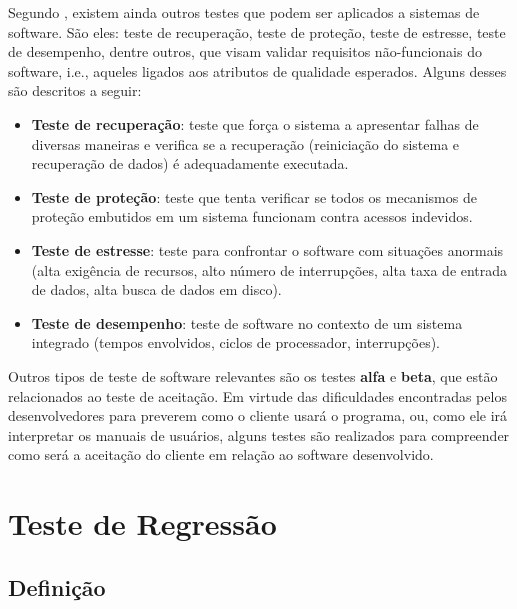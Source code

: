 Segundo , existem ainda outros testes que podem ser aplicados a sistemas de software. São eles: teste de recuperação, teste de proteção, teste de estresse, teste de desempenho, dentre outros, que visam validar requisitos não-funcionais do software, i.e., aqueles ligados aos atributos de qualidade esperados. Alguns desses são descritos a seguir:

\begin{itemize}
    
    \item \textbf{Teste de recuperação}: teste que força o sistema a apresentar falhas de diversas maneiras e verifica se a recuperação (reiniciação do sistema e recuperação de dados) é adequadamente executada.
    
    \item \textbf{Teste de proteção}: teste que tenta verificar se todos os mecanismos de proteção embutidos em um sistema funcionam contra acessos indevidos.
    
    \item \textbf{Teste de estresse}: teste para confrontar o software com situações anormais (alta exigência de recursos, alto número de interrupções, alta taxa de entrada de dados, alta busca de dados em disco).
    
    \item \textbf{Teste de desempenho}: teste de software no contexto de um sistema integrado (tempos envolvidos, ciclos de processador, interrupções).

\end{itemize}

Outros tipos de teste de software relevantes são os testes \textbf{alfa} e \textbf{beta}, que estão relacionados ao teste de aceitação. Em virtude das dificuldades encontradas pelos desenvolvedores para preverem como o cliente usará o programa, ou, como ele irá interpretar os manuais de usuários, alguns testes são realizados para compreender como será a aceitação do cliente em relação ao software desenvolvido. 


\section{Teste de Regressão}\label{sec:testesregressao}

\subsection{Definição}


